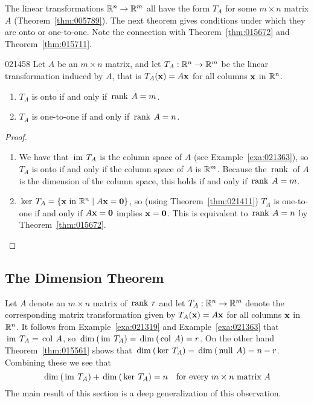 The linear transformations $\mathbb{R}^n \to \mathbb{R}^m$ all have the form $T_{A}$ for some $m \times n$ matrix $A$ (Theorem~\ref{thm:005789}). The next theorem gives conditions under which they are onto or one-to-one. Note the connection with Theorem~\ref{thm:015672} and Theorem~\ref{thm:015711}.

\newpage
\begin{theorem}{}{021458}
Let $A$ be an $m \times n$ matrix, and let $T_{A} : \mathbb{R}^n \to \mathbb{R}^m$ be the linear transformation induced by $A$, that is $T_{A}(\textbf{x}) = A\textbf{x}$ for all columns $\textbf{x}$ in $\mathbb{R}^n$.

\begin{enumerate}
\item $T_{A}$ is onto if and only if $\thinspace\operatorname{rank \medspace}A = m$.

\item $T_{A}$ is one-to-one if and only if $\thinspace\operatorname{rank \medspace}A = n$.

\end{enumerate}

\end{theorem}

\begin{proof}
\begin{enumerate}
\item We have that $\thinspace\operatorname{im \medspace}T_{A}$ is the column space of $A$ (see Example~\ref{exa:021363}), so $T_{A}$ is onto if and only if the column space of $A$ is $\mathbb{R}^m$. Because the $\thinspace\operatorname{rank \medspace}$ of $A$ is the dimension of the column space, this holds if and only if $\thinspace\operatorname{rank \medspace}A = m$.

\item $\thinspace\operatorname{ker \medspace}T_{A} = \{\textbf{x} \mbox{ in } \mathbb{R}^n \mid A\textbf{x} = \textbf{0}\}$, so (using Theorem~\ref{thm:021411}) $T_{A}$ is one-to-one if and only if $A\textbf{x} = \textbf{0}$ implies $\textbf{x} = \textbf{0}$. This is equivalent to $\thinspace\operatorname{rank \medspace}A = n$ by Theorem~\ref{thm:015672}.

\end{enumerate}
\vspace*{-2em}\end{proof}

\vspace{-1em}
\subsection*{The Dimension Theorem}

Let $A$ denote an $m \times n$ matrix of $\thinspace\operatorname{rank \medspace}r$ and let $T_{A} : \mathbb{R}^n \to \mathbb{R}^m$ denote the corresponding matrix transformation given by $T_{A}(\textbf{x}) = A\textbf{x}$ for all columns $\textbf{x}$ in $\mathbb{R}^n$. It follows from Example~\ref{exa:021319} and Example~\ref{exa:021363} that $\thinspace\operatorname{im \medspace}T_{A} = \thinspace\operatorname{col \medspace}A$, so $\thinspace\operatorname{dim\medspace}(\thinspace\operatorname{im \medspace}T_{A}) = \thinspace\operatorname{dim\medspace}(\thinspace\operatorname{col \medspace}A) = r$. On the other hand Theorem~\ref{thm:015561} shows that $\thinspace\operatorname{dim\medspace}(\thinspace\operatorname{ker \medspace}T_{A}) = \thinspace\operatorname{dim\medspace}(\thinspace\operatorname{null \medspace}A) = n - r$. Combining these we see that
\begin{equation*}
\thinspace\operatorname{dim\medspace}(\thinspace\operatorname{im\medspace} T_A) + \thinspace\operatorname{dim\medspace}(\thinspace\operatorname{ker \medspace}T_A) = n \quad \mbox{for every } m \times n \mbox{ matrix } A
\end{equation*}
The main result of this section is a deep generalization of this observation.


